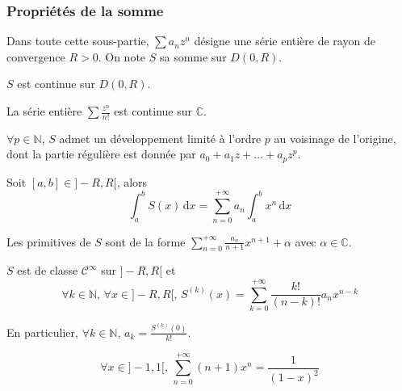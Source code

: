 	\subsubsection{Propriétés de la somme}
	
	
	Dans toute cette sous-partie, $\sum a_n z^n$ désigne une série entière de rayon de convergence $R > 0$. On note $S$ sa somme sur $D(0,R)$.
	
	\begin{proposition}
		$S$ est continue sur $D(0,R)$.
	\end{proposition}
	
	\begin{example}
		La série entière $\sum \frac{z^n}{n!}$ est continue sur $\mathbb{C}$.
	\end{example}
	
	\begin{corollary}
		$\forall p \in \mathbb{N}$, $S$ admet un développement limité à l'ordre $p$ au voisinage de l'origine, dont la partie régulière est donnée par $a_0 + a_1z + \dots + a_pz^p$.
	\end{corollary}
	
	\begin{proposition}
		Soit $[a, b] \in ]-R, R[$, alors
		\[ \int_{a}^{b} S(x) \, \mathrm{d}x = \sum_{n=0}^{+\infty} a_n \int_{a}^{b} x^n \, \mathrm{d}x \]
	\end{proposition}
	
	\begin{corollary}
		Les primitives de $S$ sont de la forme $\sum_{n=0}^{+\infty} \frac{a_n}{n+1} x^{n+1} + \alpha$ avec $\alpha \in \mathbb{C}$.
	\end{corollary}
	
	\begin{proposition}
		$S$ est de classe $\mathcal{C}^\infty$ sur $]-R,R[$ et
		\[ \forall k \in \mathbb{N}, \, \forall x \in ]-R,R[, \, S^{(k)}(x) = \sum_{k = 0}^{+\infty} \frac{k!}{(n-k)!} a_n x^{n-k} \]
	\end{proposition}
	
	\begin{remark}
		En particulier, $\forall k \in \mathbb{N}$, $a_k = \frac{S^{(k)}(0)}{k!}$.
	\end{remark}
	
	\begin{example}
		\[ \forall x \in ]-1, 1[, \, \sum_{n=0}^{+\infty} (n+1)x^n = \frac{1}{(1-x)^2} \]
	\end{example}
	
